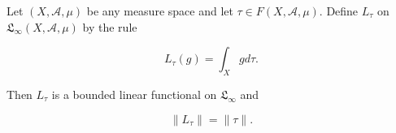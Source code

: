 Let $(X, \mathcal{A}, \mu)$ be any measure space and let $\tau \in F(X, \mathcal{A}, \mu)$. Define $L_{\tau}$ on $\mathfrak{L}_{\infty}(X, \mathcal{A}, \mu)$ by the rule

$$L_{\tau}(g) = \int_X g d\tau.$$

Then $L_{\tau}$ is a bounded linear functional on $\mathfrak{L}_{\infty}$ and

$$\|L_{\tau}\| = \|\tau\|.$$
